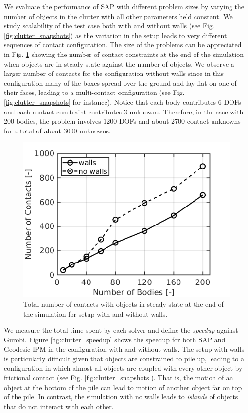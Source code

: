 We evaluate the performance of SAP with different problem sizes by varying the
number of objects in the clutter with all other parameters held constant. We
study scalability of the test case both with and without walls (see
Fig. \ref{fig:clutter_snapshots}) as the variation in the setup leads to very
different sequences of contact configuration. The size of the problems can be
appreciated in Fig. \ref{fig:clutter_num_contats} showing the number of contact
constraints at the end of the simulation when objects are in steady state
against the number of objects. We observe a larger number of contacts for the
configuration without walls since in this configuration many of the boxes spread
over the ground and lay flat on one of their faces, leading to a multi-contact
configuration (see Fig. \ref{fig:clutter_snapshots} for instance). Notice that
each body contributes 6 DOFs and each contact constraint contributes 3 unknowns.
Therefore, in the case with 200 bodies, the problem involves 1200 DOFs and about
2700 contact unknowns for a total of about 3000 unknowns.
\begin{figure}[!h]
	\centering
	\includegraphics[width=0.6\columnwidth]{figures/clutter/number_of_contacts.png}
	\caption{\label{fig:clutter_num_contats} 
	Total number of contacts with objects in steady state at the end of the
	simulation for setup with and without walls.}
\end{figure}

We measure the total time spent by each solver and define the \emph{speedup}
against Gurobi. Figure \ref{fig:clutter_speedup} shows the speedup for both
SAP and Geodesic IPM in the configuration with and without walls.
The setup with walls is particularly difficult given that objects are
constrained to pile up, leading to a configuration in which almost all objects
are coupled with every other object by frictional contact
(see Fig. \ref{fig:clutter_snapshots}). That is, the motion of an object at the
bottom of the pile can lead to motion of another object far on top of the pile.
In contrast, the simulation with no walls leads to \emph{islands} of objects
that do not interact with each other.

